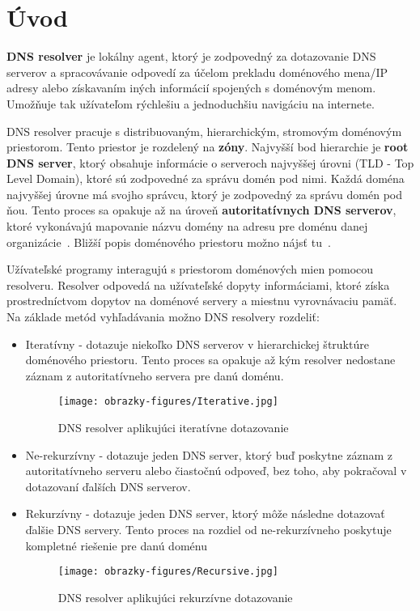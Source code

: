 
\chapter{Úvod}
\textbf{DNS resolver} je lokálny agent, ktorý je zodpovedný za dotazovanie DNS serverov a spracovávanie odpovedí za účelom prekladu doménového mena/IP adresy alebo získavaním iných informácií spojených s doménovým menom. Umožňuje tak užívateľom rýchlešiu a jednoduchšiu navigáciu na internete.~\cite{RFC1035}

DNS resolver pracuje s distribuovaným, hierarchickým, stromovým doménovým priestorom. Tento priestor je rozdelený na \textbf{zóny}. Najvyšší bod hierarchie je \textbf{root DNS server}, ktorý obsahuje informácie o serveroch najvyššej úrovni (TLD - Top Level Domain), ktoré sú zodpovedné za správu domén pod nimi. Každá doména najvyššej úrovne má svojho správcu, ktorý je zodpovedný za správu domén pod ňou. Tento proces sa opakuje až na úroveň \textbf{autoritatívnych DNS serverov}, ktoré vykonávajú mapovanie názvu domény na adresu pre doménu danej organizácie~\cite{enwiki:1182387275}. Bližší popis doménového priestoru možno nájsť tu~\cite{RFC1034}.

Užívateľské programy interagujú s priestorom doménových mien pomocou resolveru. Resolver odpovedá na užívateľské dopyty informáciami, ktoré získa prostredníctvom dopytov na doménové servery a miestnu vyrovnávaciu pamäť. Na základe metód vyhľadávania možno DNS resolvery rozdeliť:
\begin{itemize}
    \item Iteratívny - dotazuje niekoľko DNS serverov v hierarchickej štruktúre doménového priestoru. Tento proces sa opakuje až kým resolver nedostane záznam z autoritatívneho servera pre danú doménu.
    \begin{figure}[ht!]
        \centering     %
        \texttt{[image: obrazky-figures/Iterative.jpg]}
        \caption{DNS resolver aplikujúci iteratívne dotazovanie}
        \label{fig:iterative-DNS-resolver}
    \end{figure}
    
    \item Ne-rekurzívny - dotazuje jeden DNS server, ktorý buď poskytne záznam z autoritatívneho serveru alebo čiastočnú odpoveď, bez toho, aby pokračoval v dotazovaní ďalších DNS serverov.
    
    \item Rekurzívny - dotazuje jeden DNS server, ktorý môže následne dotazovať ďalšie DNS servery. Tento proces na rozdiel od ne-rekurzívneho poskytuje kompletné riešenie pre danú doménu
    
    \begin{figure}[ht!]
        \centering     %
        \texttt{[image: obrazky-figures/Recursive.jpg]}
        \caption{DNS resolver aplikujúci rekurzívne dotazovanie}
        \label{fig:recursive-DNS-resolver}
    \end{figure}
\end{itemize}

